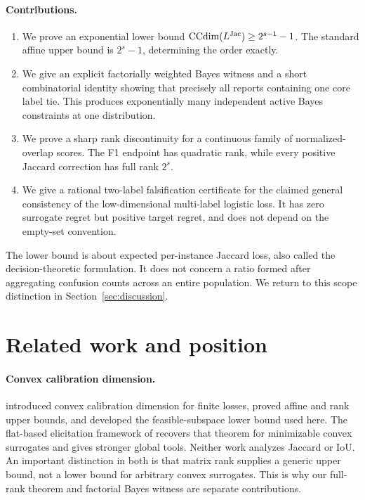 \documentclass{article}
\newcommand{\1}{\mathbf 1}
\newcommand{\CCdim}{\operatorname{CCdim}}
\begin{document}
\paragraph{Contributions.}
\begin{enumerate}[leftmargin=*,itemsep=2pt,topsep=3pt]
\item We prove an exponential lower bound
$\CCdim(L^{\rm Jac})\geq 2^{s-1}-1$. The standard affine upper bound is $2^s-1$, determining the order exactly.
\item We give an explicit factorially weighted Bayes witness and a short
combinatorial identity showing that precisely all reports containing one core label tie. This produces exponentially many independent active Bayes constraints at one distribution.
\item We prove a sharp rank discontinuity for a continuous family of
normalized-overlap scores. The F1 endpoint has quadratic rank, while every positive Jaccard correction has full rank $2^s$.
\item We give a rational two-label falsification certificate for the claimed
general consistency of the low-dimensional multi-label logistic loss. It has zero surrogate regret but positive target regret, and does not depend on the empty-set convention.
\end{enumerate}

The lower bound is about expected per-instance Jaccard loss, also called the decision-theoretic formulation. It does not concern a ratio formed after aggregating confusion counts across an entire population. We return to this scope distinction in Section~\ref{sec:discussion}.

\section{Related work and position}
\label{sec:related}

\paragraph{Convex calibration dimension.}
\citet{ramaswamy2016ccdim} introduced convex calibration dimension for finite losses, proved affine and rank upper bounds, and developed the feasible-subspace lower bound used here. The flat-based elicitation framework of \citet{finocchiaro2021lower} recovers that theorem for minimizable convex surrogates and gives stronger global tools. Neither work analyzes Jaccard or IoU. An important distinction in both is that matrix rank supplies a generic upper bound, not a lower bound for arbitrary convex surrogates. This is why our full-rank theorem and factorial Bayes witness are separate contributions.
\end{document}
